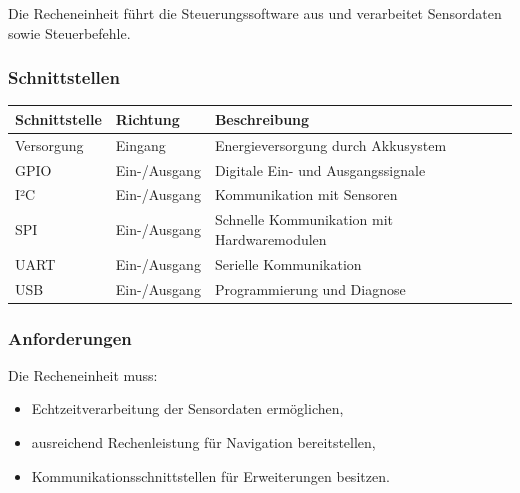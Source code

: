 \documentclass[
  a4paper,
  12pt,
  DIV=12,        %
  parskip=half,  %
  headings=small %
]{scrartcl}
\theoremstyle{definition}
\providecommand{\tightlist}{%
  \setlength{\itemsep}{0pt}\setlength{\parskip}{0pt}}
\theoremstyle{definition}
\providecommand{\tightlist}{%
  \setlength{\itemsep}{0pt}\setlength{\parskip}{0pt}}
\begin{document}
Die Recheneinheit führt die Steuerungssoftware aus und verarbeitet
Sensordaten sowie Steuerbefehle.

\subsubsection{Schnittstellen}\label{schnittstellen-1}

\begin{longtable}[]{@{}
  >{\raggedright\arraybackslash}p{}
  >{\raggedright\arraybackslash}p{}
  >{\raggedright\arraybackslash}p{}@{}}
\toprule\noalign{}
\begin{minipage}[b]{\linewidth}\raggedright
Schnittstelle
\end{minipage} & \begin{minipage}[b]{\linewidth}\raggedright
Richtung
\end{minipage} & \begin{minipage}[b]{\linewidth}\raggedright
Beschreibung
\end{minipage} \\
\midrule\noalign{}
\endhead
\bottomrule\noalign{}
\endlastfoot
Versorgung & Eingang & Energieversorgung durch Akkusystem \\
GPIO & Ein-/Ausgang & Digitale Ein- und Ausgangssignale \\
I²C & Ein-/Ausgang & Kommunikation mit Sensoren \\
SPI & Ein-/Ausgang & Schnelle Kommunikation mit Hardwaremodulen \\
UART & Ein-/Ausgang & Serielle Kommunikation \\
USB & Ein-/Ausgang & Programmierung und Diagnose \\
\end{longtable}

\subsubsection{Anforderungen}\label{anforderungen-3}

Die Recheneinheit muss:

\begin{itemize}
\tightlist
\item
  Echtzeitverarbeitung der Sensordaten ermöglichen,
\item
  ausreichend Rechenleistung für Navigation bereitstellen,
\item
  Kommunikationsschnittstellen für Erweiterungen besitzen.
\end{itemize}
\end{document}
